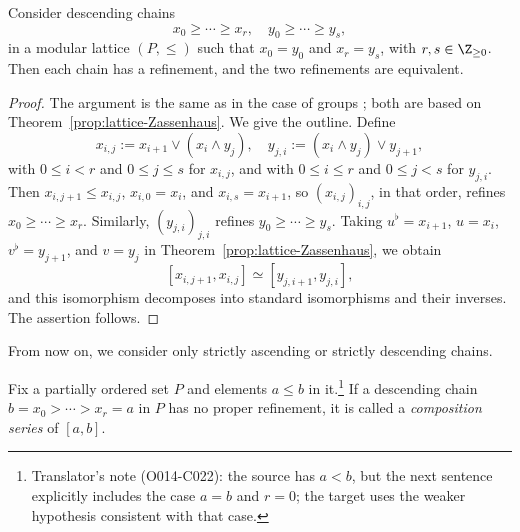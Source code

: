\begin{theorem}\label{prop:Schreier-refinement}
	\mbox{}\par
	Consider descending chains
	\[ x_0 \geq \cdots \geq x_r, \quad y_0 \geq \cdots \geq y_s, \]
	in a modular lattice $(P,\leq)$ such that $x_0=y_0$ and $x_r=y_s$, with
	$r,s\in\Z_{\geq0}$. Then each chain has a refinement, and the two
	refinements are equivalent.
\end{theorem}
\begin{proof}
	The argument is the same as in the case of groups
	\cite[Theorem 4.6.6]{Li1}; both are based on
	Theorem~\ref{prop:lattice-Zassenhaus}. We give the outline. Define
	\[ x_{i, j} := x_{i+1} \vee (x_i \wedge y_j), \quad y_{j, i} := (x_i \wedge y_j) \vee y_{j+1}, \]
	with $0\leq i<r$ and $0\leq j\leq s$ for $x_{i,j}$, and with
	$0\leq i\leq r$ and $0\leq j<s$ for $y_{j,i}$. Then
	$x_{i,j+1}\leq x_{i,j}$, $x_{i,0}=x_i$, and $x_{i,s}=x_{i+1}$, so
	$\left(x_{i,j}\right)_{i,j}$, in that order, refines
	$x_0\geq\cdots\geq x_r$. Similarly,
	$\left(y_{j,i}\right)_{j,i}$ refines $y_0\geq\cdots\geq y_s$. Taking
	$u^\flat=x_{i+1}$, $u=x_i$, $v^\flat=y_{j+1}$, and $v=y_j$ in
	Theorem~\ref{prop:lattice-Zassenhaus}, we obtain
	\[ \left[ x_{i, j+1}, x_{i,j} \right] \simeq \left[ y_{j, i+1}, y_{j, i} \right], \]
	and this isomorphism decomposes into standard isomorphisms and their
	inverses. The assertion follows.
\end{proof}

From now on, we consider only strictly ascending or strictly descending
chains.

\begin{definition}
	Fix a partially ordered set $P$ and elements $a\leq b$ in
	it.\footnote{Translator's note (O014-C022): the source has $a<b$, but the
	next sentence explicitly includes the case $a=b$ and $r=0$; the target uses
	the weaker hypothesis consistent with that case.} If a descending chain
	$b=x_0>\cdots>x_r=a$ in $P$ has no proper refinement, it is called a
	\emph{composition series} of $[a,b]$.
\end{definition}

